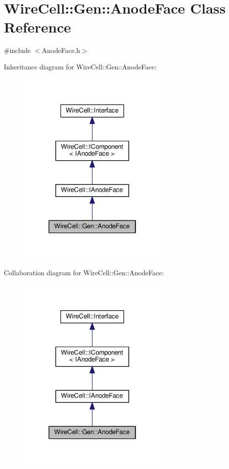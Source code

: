 \hypertarget{class_wire_cell_1_1_gen_1_1_anode_face}{}\section{Wire\+Cell\+:\+:Gen\+:\+:Anode\+Face Class Reference}
\label{class_wire_cell_1_1_gen_1_1_anode_face}


{\ttfamily \#include $<$Anode\+Face.\+h$>$}



Inheritance diagram for Wire\+Cell\+:\+:Gen\+:\+:Anode\+Face\+:
\nopagebreak
\begin{figure}[H]
\begin{center}
\leavevmode
\includegraphics[width=214pt]{class_wire_cell_1_1_gen_1_1_anode_face__inherit__graph}
\end{center}
\end{figure}


Collaboration diagram for Wire\+Cell\+:\+:Gen\+:\+:Anode\+Face\+:
\nopagebreak
\begin{figure}[H]
\begin{center}
\leavevmode
\includegraphics[width=214pt]{class_wire_cell_1_1_gen_1_1_anode_face__coll__graph}
\end{center}
\end{figure}
